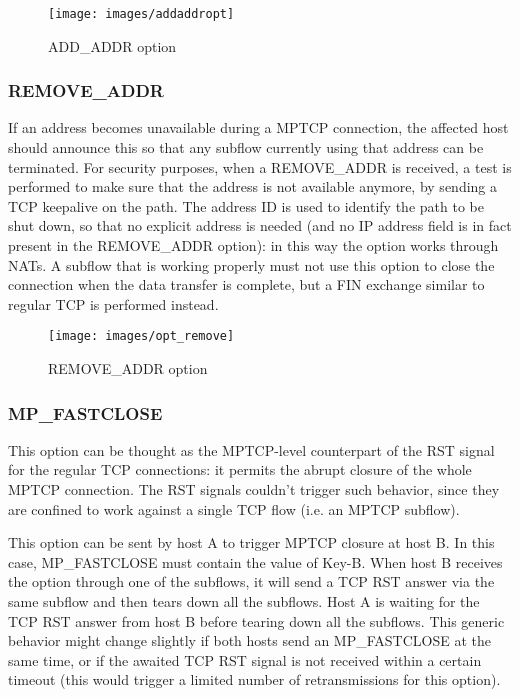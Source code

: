 \begin{figure}[!htb]
\centering
\texttt{[image: images/addaddropt]}
\caption{ADD\_ADDR option}
\label{fig:addaddropt}
\end{figure}

\subsubsection{REMOVE\_ADDR}
If an address becomes unavailable during a MPTCP connection, the affected host should announce this so that any subflow currently using that address can be terminated. For security purposes, when a REMOVE\_ADDR is received, a test is performed to make sure that the address is not available anymore, by sending a TCP keepalive on the path.
The address ID is used to identify the path to be shut down, so that no explicit address is needed (and no IP address field is in fact present in the REMOVE\_ADDR option): in this way the option works through NATs. 
A subflow that is working properly must not use this option to close the connection when the data transfer is complete, but a FIN exchange similar to regular TCP is performed instead.

\begin{figure}[!htb]
\centering
\texttt{[image: images/opt\_remove]}
\caption{REMOVE\_ADDR option}
\label{fig:opt_remove}
\end{figure}

\subsubsection{MP\_FASTCLOSE}
This option can be thought as the MPTCP-level counterpart of the RST signal for the regular TCP connections: it permits the abrupt closure of the whole MPTCP connection. The RST signals couldn't trigger such behavior, since they are confined to work against a single TCP flow (i.e. an MPTCP subflow).

This option can be sent by host A to trigger MPTCP closure at host B. In this case, MP\_FASTCLOSE must contain the value of Key-B. When host B receives the option through one of the subflows, it will send a TCP RST answer via the same subflow and then tears down all the subflows. Host A is waiting for the TCP RST answer from host B before tearing down all the subflows. This generic behavior might change slightly if both hosts send an MP\_FASTCLOSE at the same time, or if the awaited TCP RST signal is not received within a certain timeout (this would trigger a limited number of retransmissions for this option).

